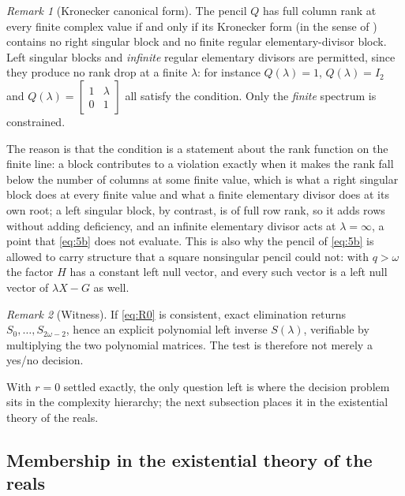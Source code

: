 \documentclass[journal]{IEEEtran}
\theoremstyle{plainn}
\theoremstyle{remark}
\newtheorem{remark}{Remark}
\begin{document}
\begin{remark}[Kronecker canonical form]\label{rem:kronecker}
The pencil $Q$ has full column rank at every finite complex value if and only if its Kronecker
form (in the sense of \cite{bee88}) contains no right singular block and no finite regular
elementary-divisor block. Left singular blocks and \emph{infinite} regular elementary divisors are
permitted, since they produce no rank drop at a finite $\lambda$: for instance
$Q(\lambda)=1$, $Q(\lambda)=I_2$ and $Q(\lambda)=\begin{bmatrix}1&\lambda\\0&1\end{bmatrix}$ all
satisfy the condition. Only the \emph{finite} spectrum is constrained.

The reason is that the condition is a statement about the rank function on the finite line: a block
contributes to a violation exactly when it makes the rank fall below the number of columns at some
finite value, which is what a right singular block does at every finite value and what a finite
elementary divisor does at its own root; a left singular block, by contrast, is of full row rank, so it
adds rows without adding deficiency, and an infinite elementary divisor acts at $\lambda=\infty$, a
point that \eqref{eq:5b} does not evaluate. This is also why the pencil of \eqref{eq:5b} is allowed to
carry structure that a square nonsingular pencil could not: with $q>\omega$ the factor $H$ has a
constant left null vector, and every such vector is a left null vector of $\lambda X-G$ as well.
\end{remark}

\begin{remark}[Witness]\label{rem:witness}
If \eqref{eq:R0} is consistent, exact elimination returns
$S_0,\dots,S_{2\omega-2}$, hence an explicit polynomial left inverse
$S(\lambda)$, verifiable by multiplying the two polynomial matrices. The test is
therefore not merely a yes/no decision.
\end{remark}

With $r=0$ settled exactly, the only question left is where the decision problem sits in the
complexity hierarchy; the next subsection places it in the existential theory of the reals.

\subsection{Membership in the existential theory of the reals}\label{sec:existsr}
\end{document}
